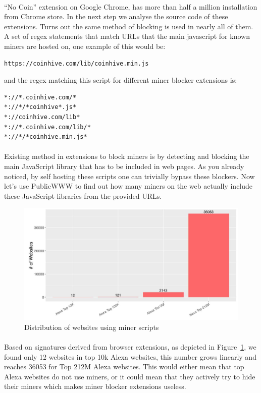 \documentclass[letterpaper]{scrartcl} %
\numberwithin{equation}{section} %
\numberwithin{figure}{section} %
\numberwithin{table}{section} %
\begin{document}
\paragraph{}
``No Coin'' extension on Google Chrome, has more than half a million installation from Chrome store. In the next step we analyse the source code of these extensions. Turns out the same method of blocking is used in nearly all of them. A set of regex statements that match URLs that the main javascript for known miners are hosted on, one example of this would be:

\begin{lstlisting}
https://coinhive.com/lib/coinhive.min.js
\end{lstlisting}
and the regex matching this script for different miner blocker extensions is:
\begin{lstlisting}
*://*.coinhive.com/*
*://*/*coinhive*.js*
*://coinhive.com/lib*
*://*.coinhive.com/lib/*
*://*/*coinhive.min.js*
\end{lstlisting}

\paragraph{}
Existing method in extensions to block miners is by detecting and blocking the main JavaScript library that has to be included in web pages. As you already noticed, by self hosting these scripts one can trivially bypass these blockers. Now let's use PublicWWW to find out how many miners on the web actually include these JavaScript libraries from the provided URLs.

\begin{figure}[t]
\centering
\includegraphics[width=0.8\columnwidth]{figures/miners-on-top-alexa.jpg}
\caption{Distribution of websites using miner scripts}
\label{fig:miners-on-top-alexa}
\end{figure}

\paragraph{}
Based on signatures derived from browser extensions, as depicted in Figure~\ref{fig:miners-on-top-alexa}, we found only 12 websites in top 10k Alexa websites, this number grows linearly and reaches 36053 for Top 212M Alexa websites. This would either mean that top Alexa websites do not use miners, or it could mean that they actively try to hide their miners which makes miner blocker extensions useless.
\end{document}
